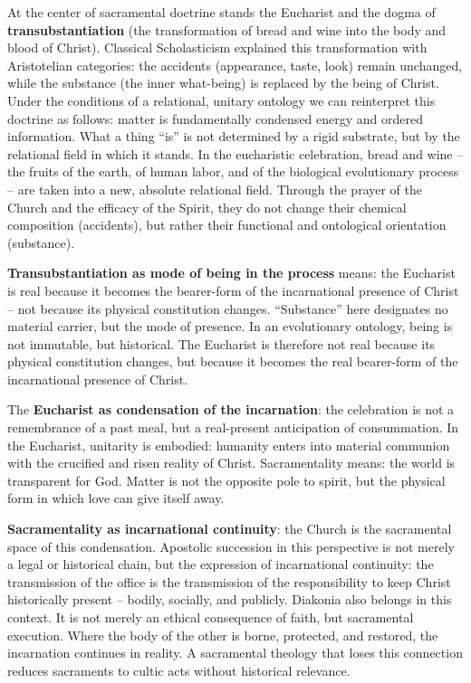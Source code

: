 \documentclass[
  english,
]{article}
\begin{document}
At the center of sacramental doctrine stands the Eucharist and the dogma
of \textbf{transubstantiation} (the transformation of bread and wine
into the body and blood of Christ). Classical Scholasticism explained
this transformation with Aristotelian categories: the accidents
(appearance, taste, look) remain unchanged, while the substance (the
inner what-being) is replaced by the being of Christ. Under the
conditions of a relational, unitary ontology we can reinterpret this
doctrine as follows: matter is fundamentally condensed energy and
ordered information. What a thing ``is'' is not determined by a rigid
substrate, but by the relational field in which it stands. In the
eucharistic celebration, bread and wine -- the fruits of the earth, of
human labor, and of the biological evolutionary process -- are taken
into a new, absolute relational field. Through the prayer of the Church
and the efficacy of the Spirit, they do not change their chemical
composition (accidents), but rather their functional and ontological
orientation (substance).

\textbf{Transubstantiation as mode of being in the process} means: the
Eucharist is real because it becomes the bearer-form of the
incarnational presence of Christ -- not because its physical
constitution changes. ``Substance'' here designates no material carrier,
but the mode of presence. In an evolutionary ontology, being is not
immutable, but historical. The Eucharist is therefore not real because
its physical constitution changes, but because it becomes the real
bearer-form of the incarnational presence of Christ.

The \textbf{Eucharist as condensation of the incarnation}: the
celebration is not a remembrance of a past meal, but a real-present
anticipation of consummation. In the Eucharist, unitarity is embodied:
humanity enters into material communion with the crucified and risen
reality of Christ. Sacramentality means: the world is transparent for
God. Matter is not the opposite pole to spirit, but the physical form in
which love can give itself away.

\textbf{Sacramentality as incarnational continuity}: the Church is the
sacramental space of this condensation. Apostolic succession in this
perspective is not merely a legal or historical chain, but the
expression of incarnational continuity: the transmission of the office
is the transmission of the responsibility to keep Christ historically
present -- bodily, socially, and publicly. Diakonia also belongs in this
context. It is not merely an ethical consequence of faith, but
sacramental execution. Where the body of the other is borne, protected,
and restored, the incarnation continues in reality. A sacramental
theology that loses this connection reduces sacraments to cultic acts
without historical relevance.
\end{document}
